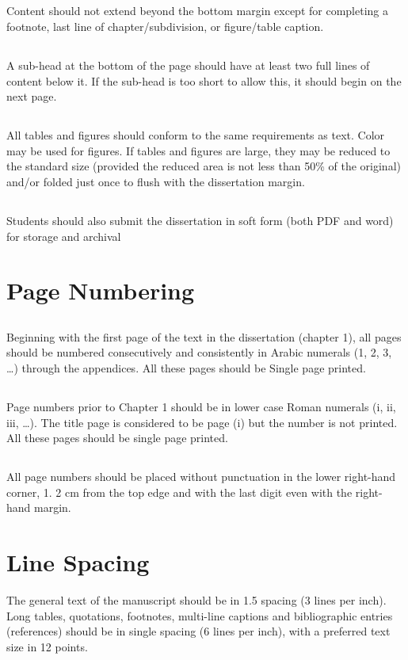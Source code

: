 \subsection{}
Content should not extend beyond the bottom margin except for completing a footnote, last line of chapter/subdivision, or figure/table caption.
\subsection{}
A sub-head at the bottom of the page should have at least two full lines of content below it. If the sub-head is too short to allow this, it should begin on the next page. 
\subsection{}
All tables and figures should conform to the same requirements as text. Color may be used for figures. If tables and figures are large, they may be reduced to the standard size (provided the reduced area is not less than 50\% of the original) and/or folded just once to flush with the dissertation margin. 
\subsection{}
Students should also submit the dissertation in soft form (both PDF and word) for storage and archival

\section{Page Numbering}
\subsection{}
Beginning with the first page of the text in the dissertation (chapter 1), all pages should be numbered consecutively and consistently in Arabic numerals (1, 2, 3, …) through the appendices. All these pages should be Single page printed.
\subsection{}
Page numbers prior to Chapter 1 should be in lower case Roman numerals (i, ii, iii, …). The title page is considered to be page (i) but the number is not printed. All these pages should be single page printed. 

\subsection{}
All page numbers should be placed without punctuation in the lower right-hand corner, 1. 2 cm from the top edge and with the last digit even with the right-hand margin.

\section{Line Spacing}
The general text of the manuscript should be in 1.5 spacing (3 lines per inch). Long tables, quotations, footnotes, multi-line captions and bibliographic entries (references) should be in single spacing (6 lines per inch), with a preferred text size in 12 points. 

